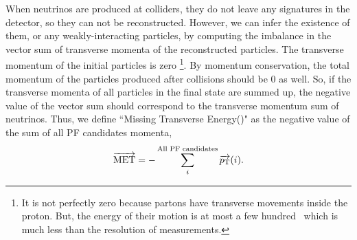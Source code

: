 When neutrinos are produced at colliders, they do not leave any signatures
in the detector, so they can not be reconstructed. However, we can infer 
the existence of them, or any weakly-interacting particles, by computing 
the imbalance in the vector sum of transverse momenta of the reconstructed particles.
The transverse momentum of the initial particles is zero 
\footnote{It is not perfectly zero because partons have transverse movements 
inside the proton. But, the energy of their motion is at most a few hundred \MeV\
which is much less than the resolution of measurements.}.
By momentum conservation, the total momentum of the particles produced 
after collisions should be 0 as well. 
So, if the transverse momenta of all particles in the final state are summed up, 
the negative value of the vector sum should correspond to the transverse momentum 
sum of neutrinos. Thus, we define ``Missing Transverse Energy(\met)"
as the negative value of the sum of all PF candidates momenta, 
\begin{eqnarray} 
\overrightarrow{\mathrm{MET}} = - \sum^{\textrm{All PF candidates}}_i \overrightarrow{p_\mathrm{T}}(i).
\end{eqnarray} 

